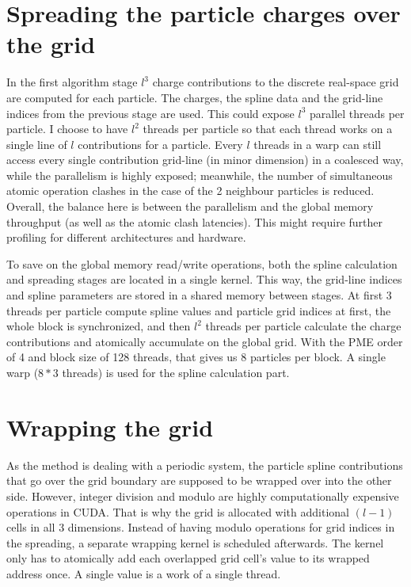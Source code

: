 \documentclass[12pt,a4paper,notitlepage]{report}
\newcommand{\draft}[1]{#1}
\begin{document}
\section{Spreading the particle charges over the grid}
In the first algorithm stage $l^3$ charge contributions to the discrete real-space grid are computed for each particle. The charges, the spline data and the grid-line indices from the previous stage are used.
This could expose $l^3$ parallel threads per particle. 
I choose to have $l^2$ threads per particle so that each thread works on a single line of $l$ contributions for a particle. Every $l$ threads in a warp can still access every single contribution grid-line (in minor dimension) in a coalesced way, while the parallelism is highly exposed; meanwhile, the number of simultaneous atomic operation clashes in the case of the 2 neighbour particles is reduced. Overall, the balance here is between the parallelism and the global memory throughput (as well as the atomic clash latencies). This might require further profiling for different architectures and hardware.

To save on the global memory read/write operations, both the spline calculation and spreading stages are located in a single kernel. This way, the grid-line indices and spline parameters are stored in a shared memory between stages. At first 3 threads per particle compute spline values and particle grid indices at first, the whole block is synchronized, and then $l^2$ threads per particle calculate the charge contributions and atomically accumulate on the global grid. With the PME order of 4 and block size of 128 threads, that gives us 8 particles per block. A single warp ($8 * 3$ threads) is used for the spline calculation part.




\section{Wrapping the grid}
As the method is dealing with a periodic system, the particle spline contributions that go over the grid boundary are supposed to be wrapped over into the other side.
However, integer division and modulo are highly computationally expensive operations in CUDA. %
That is why the grid is allocated with additional $(l-1)$ cells in all 3 dimensions. Instead of having modulo operations for grid indices in the spreading, 
a separate wrapping kernel is scheduled afterwards. The kernel only has to atomically add each overlapped grid cell's value to its wrapped address once. A single value is a work of a single thread.
\end{document}
